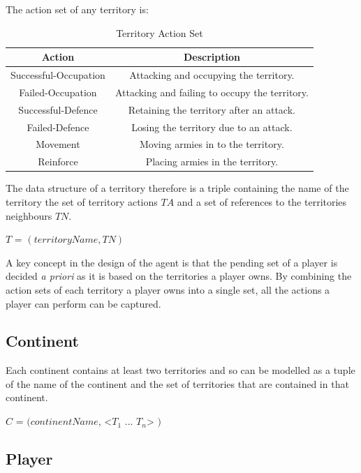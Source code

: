 \documentclass[parskip]{cs4rep}
\begin{document}
The action set of any territory is:

\begin{table}[ht]
\centering
\begin{tabular}{|c|c|}
\hline 
\textbf{Action} & \textbf{Description} \\ 
\hline 
Successful-Occupation & Attacking and occupying the territory.\\ 
\hline 
Failed-Occupation & Attacking and failing to occupy the territory.\\ 
\hline 
Successful-Defence & Retaining the territory after an attack.\\ 
\hline 
Failed-Defence & Losing the territory due to an attack.\\
\hline
Movement & Moving armies in to the territory.\\
\hline  
Reinforce & Placing armies in the territory.\\
\hline 
\end{tabular}
\caption{Territory Action Set}
\label{table:territory-actions-bonus}
\end{table}

\newpage

The data structure of a territory therefore is a triple containing the name of the territory the set of territory actions $TA$ and a set of references to the territories neighbours $TN$.

\centerline{
$T$ = $( territoryName, TN )$
}

A key concept in the design of the agent is that the pending set of a player is decided \textit{a priori} as it is based on the territories a player owns. By combining the action sets of each territory a player owns into a single set, all the actions a player can perform can be captured.

\subsection{Continent}

Each continent contains at least two territories and so can be modelled as a tuple of the name of the continent and the set of territories that are contained in that continent.

\centerline{
$C$ = $( continentName$, <$T_{1}$ ... $T_{n}$> $)$
}

\subsection{Player}
\end{document}
